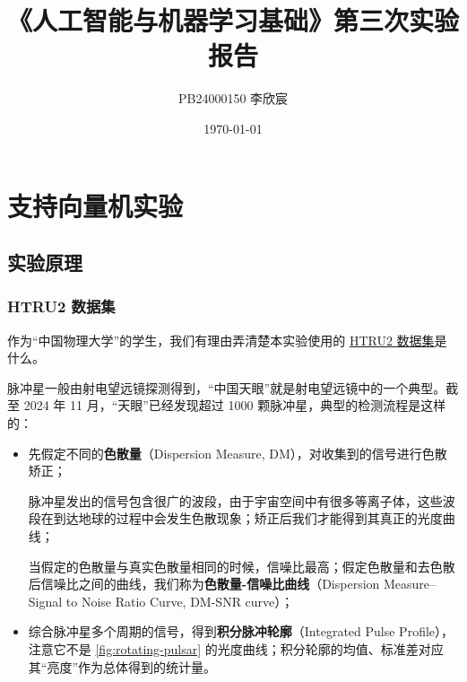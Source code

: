 \documentclass[oneside]{ctexbook}
\title{《人工智能与机器学习基础》第三次实验报告}
\author{PB24000150 李欣宸}
\date{\today}
\begin{document}
\renewcommand{\maketitlehookd}{\begin{center}报告为了保持简短，没有包含数学推导过程。所有数学推导详见我的博客：

    \href{https://xinchengo.github.io/blog-zh/2025/12/23/支持向量机决策树与集成学习/}{\tt https://xinchengo.github.io/blog-zh/2025/12/23/支持向量机决策树与集成学习/}

    该博客是我在完成作业三和实验三的过程中同步编写的
    \end{center}}

\maketitle

\tableofcontents

\chapter{支持向量机实验}

\section{实验原理}

\subsection{HTRU2 数据集}

作为“中国物理大学”的学生，我们有理由弄清楚本实验使用的 \href{https://archive.ics.uci.edu/dataset/372/htru2}{HTRU2 数据集}是什么。

脉冲星一般由射电望远镜探测得到，“中国天眼”就是射电望远镜中的一个典型。截至 2024 年 11 月，“天眼”已经发现超过 1000 颗脉冲星，典型的检测流程是这样的：

\begin{itemize}
    \item 先假定不同的{\bf 色散量}（Dispersion Measure, DM），对收集到的信号进行色散矫正；
    
    脉冲星发出的信号包含很广的波段，由于宇宙空间中有很多等离子体，这些波段在到达地球的过程中会发生色散现象；矫正后我们才能得到其真正的光度曲线；

    当假定的色散量与真实色散量相同的时候，信噪比最高；假定色散量和去色散后信噪比之间的曲线，我们称为{\bf 色散量-信噪比曲线}（Dispersion Measure--Signal to Noise Ratio Curve, DM-SNR curve）；

    \item 综合脉冲星多个周期的信号，得到{\bf 积分脉冲轮廓}（Integrated Pulse Profile），注意它不是 \ref{fig:rotating-pulsar} 的光度曲线；积分轮廓的均值、标准差对应其“亮度”作为总体得到的统计量。
\end{itemize}
\end{document}
